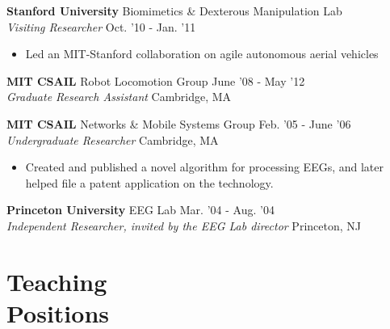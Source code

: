 \documentclass[margin]{res}
\begin{document}
\begin{resume}
{\bf Stanford University} Biomimetics \& Dexterous Manipulation Lab \\ {\it Visiting Researcher}  \hfill Oct. '10 - Jan. '11 
 \begin{itemize} \itemsep -2pt  %
\item Led an MIT-Stanford collaboration on agile autonomous aerial vehicles%
 \end{itemize}

{\bf MIT CSAIL} Robot Locomotion Group \hfill June '08 - May '12 \\  {\it Graduate Research Assistant} \hfill Cambridge, MA 
 
% 
{\bf MIT CSAIL} Networks \& Mobile Systems Group \hfill Feb. '05 - June '06 \\{\it Undergraduate Researcher}  \hfill Cambridge, MA 
 \begin{itemize} \itemsep -2pt  %
\item Created and published a novel algorithm for processing EEGs, and later helped file a patent application on the technology.
\end{itemize}


{\bf Princeton University} EEG Lab \hfill Mar. '04 - Aug. '04 \\ {\it Independent Researcher, invited by the EEG Lab director} \hfill Princeton, NJ 
 
\section{Teaching\\Positions}


\end{resume}
\end{document}
